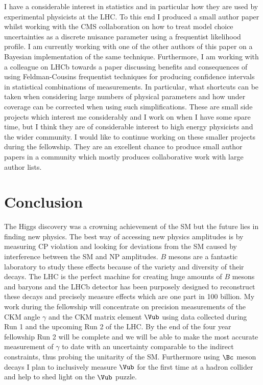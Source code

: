 \documentclass[a4paper, 10pt]{article}
\begin{document}
I have a considerable interest in statistics and in particular how they are used by experimental physicists at the LHC. To this end I produced a small author paper whilst working with the CMS collaboration on how to treat model
choice uncertainties as a discrete nuisance parameter using a frequentist likelihood profile. I am currently working with one of the other authors of this paper on a Bayesian implementation of the same technique. Furthermore, I am 
working with a colleague on LHCb towards a paper discussing benefits and consequences of using Feldman-Cousins frequentist techniques for producing confidence intervals in statistical combinations of measurements. In particular,
what shortcuts can be taken when considering large numbers of physical parameters and how under coverage can be corrected when using such simplifications. These are small side projects which interest me considerably and I work on when I have some spare time, but I think they are of considerable interest to high energy physicists and the wider community. I would like to continue working on these smaller projects during the fellowship. They are an excellent chance to produce
small author papers in a community which mostly produces collaborative work with large author lists.

\section*{Conclusion}

The Higgs discovery was a crowning achievement of the SM but the future lies in finding new physics. The best way of accessing new physics amplitudes is by measuring CP violation and looking for deviations from the SM caused
by interference between the SM and NP amplitudes. $B$ mesons are a fantastic laboratory to study these effects because of the variety and diversity of their decays. The LHC is the perfect machine for creating huge amounts of $B$ mesons and baryons and the LHCb detector has been purposely designed to reconstruct these decays and precisely measure 
effects which are one part in 100 billion. My work during the fellowship will concentrate on precision measurements of the CKM angle $\gamma$ and the CKM matrix element $\Vub$ using data collected during Run 1 and the upcoming Run 2 of the LHC. By the end of the four year fellowship Run 2 will be complete and we will be able to make the most accurate measurement of $\gamma$ to date with an uncertainty comparable to the indirect constraints, thus probing the unitarity of the SM. Furthermore using $\Bc$ meson decays I plan to inclusively measure $\Vub$ for the first time at a hadron collider and help to shed light on the $\Vub$ puzzle.
\end{document}
